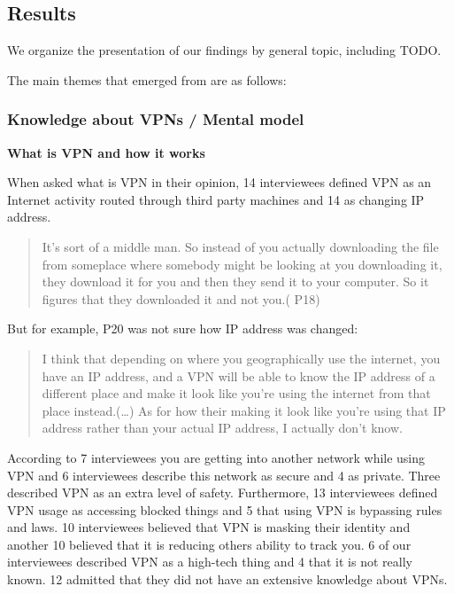 \subsection{Results}\label{sec:results}

We organize the presentation of our findings by general topic, including TODO.




The main themes that emerged from are as follows: 

\subsubsection{Knowledge about VPNs / Mental model}

\textbf{What is VPN and how it works}

When asked what is VPN in their opinion, 14 interviewees defined VPN as an
Internet activity routed through third party machines and 14 as changing IP
address.  \begin{quote}It's sort of a middle man. So instead of you actually
downloading the file from someplace where somebody might be looking at you
downloading it, they download it for you and then they send it to your
computer. So it figures that they downloaded it and not you.( P18)\end{quote}


But for example, P20 was not sure how IP address was changed: \begin{quote}I
think that depending on where you geographically use the internet, you have an
IP address, and a VPN will be able to know the IP address of a different place
and make it look like you're using the internet from that place
instead.(\dots) As for how their making it look like you're using that IP
address rather than your actual IP address, I actually don't know.\end{quote}


According to 7 interviewees you are getting into another network while using
VPN and 6 interviewees describe this network as secure and 4 as private. 
Three described VPN as an extra level of safety. Furthermore, 13 interviewees
defined VPN usage as accessing blocked things and 5 that using VPN is
bypassing rules and laws. 10 interviewees believed that VPN is masking their
identity and another 10 believed that it is reducing others ability to track
you.  6 of our interviewees described VPN as a high-tech thing and 4 that it
is not really known. 12 admitted that they did not have an extensive knowledge
about VPNs.

